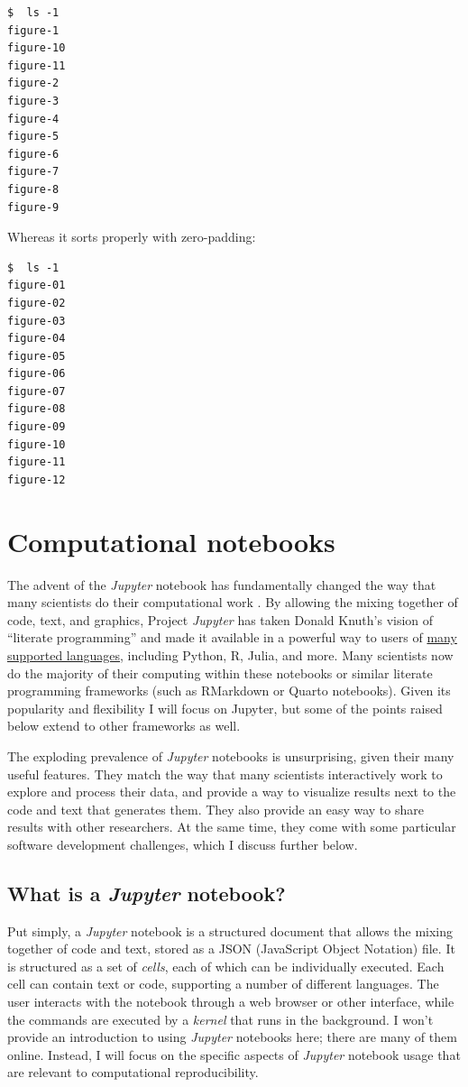 \begin{lstlisting}[style=shell]
$  ls -1
figure-1
figure-10
figure-11
figure-2
figure-3
figure-4
figure-5
figure-6
figure-7
figure-8
figure-9
\end{lstlisting}

Whereas it sorts properly with zero-padding:

\begin{lstlisting}[style=shell]
$  ls -1
figure-01
figure-02
figure-03
figure-04
figure-05
figure-06
figure-07
figure-08
figure-09
figure-10
figure-11
figure-12
\end{lstlisting}

\section{Computational notebooks}

The advent of the \textit{Jupyter} notebook has fundamentally changed the way that many scientists do their computational work \citep{Granger:2021aa}.  By allowing the mixing together of code, text, and graphics, Project \textit{Jupyter} has taken Donald Knuth's vision of ``literate programming''\citep{Knuth:1992aa} and made it available in a powerful way to users of \href{https://github.com/jupyter/jupyter/wiki/Jupyter-kernels}{many supported languages}, including Python, R, Julia, and more.  Many scientists now do the majority of their computing within these notebooks or similar literate programming frameworks (such as RMarkdown or Quarto notebooks). Given its popularity and flexibility I will focus on Jupyter, but some of the points raised below extend to other frameworks as well.

The exploding prevalence of \textit{Jupyter} notebooks is unsurprising, given their many useful features. They match the way that many scientists interactively work to explore and process their data, and provide a way to visualize results next to the code and text that generates them. They also provide an easy way to share results with other researchers. At the same time, they come with some particular software development challenges, which I discuss further below.

\subsection{What is a \textit{Jupyter} notebook?}

Put simply, a \textit{Jupyter} notebook is a structured document that allows the mixing together of code and text, stored as a JSON (JavaScript Object Notation) file.  It is structured as a set of \textit{cells}, each of which can be individually executed.  Each cell can contain text or code, supporting a number of different languages.  The user interacts with the notebook through a web browser or other interface, while the commands are executed by a \textit{kernel} that runs in the background.  I won't provide an introduction to using \textit{Jupyter} notebooks here; there are many of them online. Instead, I will focus on the specific aspects of \textit{Jupyter} notebook usage that are relevant to computational reproducibility.

